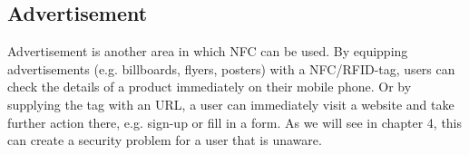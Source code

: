 \subsection{Advertisement}
Advertisement is another area in which NFC can be used. By equipping advertisements (e.g. billboards, flyers, posters) with a NFC/RFID-tag, users can check the details of a product immediately on their mobile phone. Or by supplying the tag with an URL, a user can immediately visit a website and take further action there, e.g. sign-up or fill in a form. As we will see in chapter 4, this can create a security problem for a user that is unaware. \cite{10.1109/ARES.2009.46}





